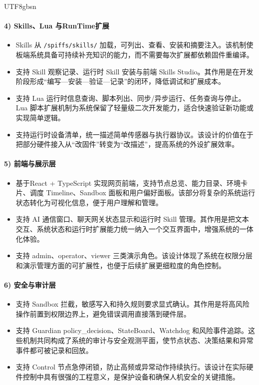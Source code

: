 \documentclass[a4paper,12pt]{article}
\begin{document}
\begin{CJK*}{UTF8}{gbsn}
\paragraph{4) Skills、Lua 与RunTime扩展}
\begin{itemize}
  \item Skills 从 \texttt{/spiffs/skills/} 加载，可列出、查看、安装和摘要注入。该机制使板端系统具备可持续补充知识的能力，而不需要每次扩展都依赖固件重编译。
  \item 支持 Skill 观察记录、运行时 Skill 安装与前端 Skills Studio。其作用是在开发阶段形成“编写---安装---验证---记录”的闭环，降低调试和扩展成本。
  \item 支持 Lua 运行时信息查询、脚本列出、同步/异步运行、任务查询与停止。Lua 脚本扩展机制为系统保留了轻量级二次开发能力，适合快速验证新功能或实现简单逻辑。
  \item 支持运行时设备清单，统一描述简单传感器与执行器协议。该设计的价值在于把部分硬件接入从“改固件”转变为“改描述”，提高系统的外设扩展效率。
\end{itemize}

\paragraph{5) 前端与展示层}
\begin{itemize}
  \item 基于React + TypeScript 实现网页前端，支持节点总览、能力目录、环境卡片、调度 Timeline、Sandbox 面板和用户偏好面板。该部分将复杂的系统运行状态转化为可视化信息，便于用户理解和管理。
  \item 支持 AI 通信窗口、聊天网关状态显示和运行时 Skill 管理。其作用是把文本交互、系统状态和运行时扩展能力统一纳入一个交互界面中，增强系统的一体化体验。
  \item 支持 admin、operator、viewer 三类演示角色。该设计体现了系统在权限分层和演示管理方面的可扩展性，也便于后续扩展更细粒度的角色控制。
\end{itemize}

\paragraph{6) 安全与审计层}
\begin{itemize}
  \item 支持 Sandbox 拦截，敏感写入和持久规则要求显式确认。其作用是将高风险操作前置到权限边界上，避免错误调用直接落到硬件层。
  \item 支持 Guardian policy\_decision、StateBoard、Watchdog 和风险事件追踪。这些机制共同构成了系统的审计与安全观测平面，使节点状态、决策结果和异常事件都可被记录和回放。
  \item 支持 Control 节点急停闭锁，防止高频或异常动作持续执行。该设计在实际硬件控制中具有很强的工程意义，是保护设备和确保人机安全的关键措施。
\end{itemize}


\end{CJK*}
\end{document}
